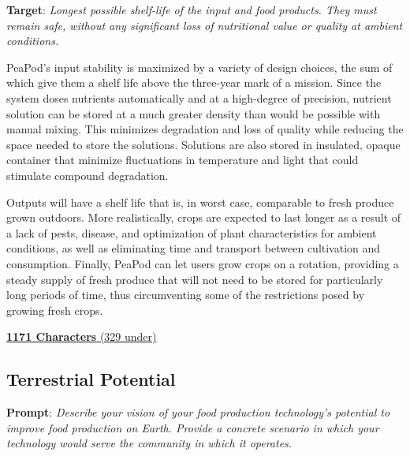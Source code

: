 \documentclass{report}
\begin{document}
\textbf{Target}: \textit{Longest possible shelf-life of the input and food products. They must remain safe, without any significant loss of nutritional value or quality at ambient conditions.}


PeaPod's input stability is maximized by a variety of design choices, the sum of which give them a shelf life above the three-year mark of a mission. Since the system doses nutrients automatically and at a high-degree of precision, nutrient solution can be stored at a much greater density than would be possible with manual mixing. This minimizes degradation and loss of quality while reducing the space needed to store the solutions. Solutions are also stored in insulated, opaque container that minimize fluctuations in temperature and light that could stimulate compound degradation.

Outputs will have a shelf life that is, in worst case, comparable to fresh produce grown outdoors. More realistically, crops are expected to last longer as a result of a lack of pests, disease, and optimization of plant characteristics for ambient conditions, as well as eliminating time and transport between cultivation and consumption. Finally, PeaPod can let users grow crops on a rotation, providing a steady supply of fresh produce that will not need to be stored for particularly long periods of time, thus circumventing some of the restrictions posed by growing fresh crops.

\uline{\textbf{1171 Characters} (329 under)}


\subsection{Terrestrial Potential}
\label{sec:terrestrial}

\textbf{Prompt}: \textit{Describe your vision of your food production technology’s potential to improve food production on Earth. Provide a concrete scenario in which your technology would serve the community in which it operates.}


\end{document}
